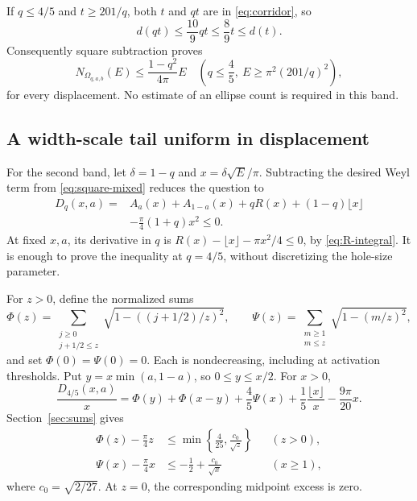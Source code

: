 \documentclass[11pt,reqno]{amsart}
\numberwithin{equation}{section}
\newcommand{\Om}{\Omega}
\begin{document}
If $q\le4/5$ and $t\ge201/q$, both $t$ and $qt$ are in
\eqref{eq:corridor}, so
\[
 d(qt)\le\frac{10}{9}qt\le\frac89t\le d(t).
\]
Consequently square subtraction proves
\begin{equation}\label{eq:wide-tail}
 N_{\Om_{q,a,b}}(E)\le\frac{1-q^2}{4\pi}E
 \quad\left(q\le\frac45,\ E\ge\pi^2(201/q)^2\right),
\end{equation}
for every displacement. No estimate of an ellipse count is
required in this band.

\subsection*{A width-scale tail uniform in displacement}

For the second band, let $\delta=1-q$ and $x=\delta\sqrt E/\pi$.
Subtracting the desired Weyl term from
\eqref{eq:square-mixed} reduces the question to
\begin{equation}\label{eq:thin-defect}
 \begin{split}
 D_q(x,a)={}&A_a(x)+A_{1-a}(x)+qR(x)
                +(1-q)\lfloor x\rfloor\\
           &-\frac\pi4(1+q)x^2\le0.
 \end{split}
\end{equation}
At fixed $x,a$, its derivative in $q$ is
$R(x)-\lfloor x\rfloor-\pi x^2/4\le0$, by
\eqref{eq:R-integral}. It is enough to prove the inequality
at $q=4/5$, without discretizing the hole-size parameter.

For $z>0$, define the normalized sums
\[
 \Phi(z)=\sum_{\substack{j\ge0\\j+1/2\le z}}
           \sqrt{1-((j+1/2)/z)^2},\qquad
 \Psi(z)=\sum_{\substack{m\ge1\\m\le z}}
           \sqrt{1-(m/z)^2},
\]
and set $\Phi(0)=\Psi(0)=0$. Each is nondecreasing, including
at activation thresholds. Put $y=x\min(a,1-a)$, so
$0\le y\le x/2$. For $x>0$,
\begin{equation}\label{eq:normalized-defect}
 \frac{D_{4/5}(x,a)}x
 =\Phi(y)+\Phi(x-y)+\frac45\Psi(x)
  +\frac15\frac{\lfloor x\rfloor}{x}-\frac{9\pi}{20}x.
\end{equation}
Section~\ref{sec:sums} gives
\begin{align}
 \Phi(z)-\frac\pi4z&\le
        \min\left\{\frac4{25},\frac{c_0}{\sqrt z}\right\}
        &&(z>0),\label{eq:Phi-bound}\\
 \Psi(x)-\frac\pi4x&\le-\frac12+\frac{c_0}{\sqrt x}
        &&(x\ge1),\label{eq:Psi-bound}
\end{align}
where $c_0=\sqrt{2/27}$. At $z=0$, the corresponding
midpoint excess is zero.
\end{document}
